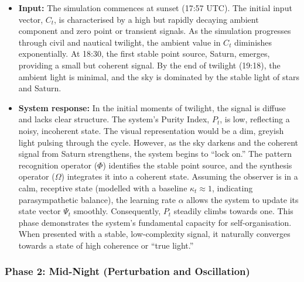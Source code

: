 \documentclass{article}
\begin{document}
\begin{itemize}
    \item \textbf{Input:} The simulation commences at sunset (17:57 UTC). The initial input vector, $C_t$, is characterised by a high but rapidly decaying ambient component and zero point or transient signals. As the simulation progresses through civil and nautical twilight, the ambient value in $C_t$ diminishes exponentially. At 18:30, the first stable point source, Saturn, emerges, providing a small but coherent signal. By the end of twilight (19:18), the ambient light is minimal, and the sky is dominated by the stable light of stars and Saturn.
    \item \textbf{System response:} In the initial moments of twilight, the signal is diffuse and lacks clear structure. The system's Purity Index, $P_t$, is low, reflecting a noisy, incoherent state. The visual representation would be a dim, greyish light pulsing through the cycle. However, as the sky darkens and the coherent signal from Saturn strengthens, the system begins to ``lock on.'' The pattern recognition operator ($\Phi$) identifies the stable point source, and the synthesis operator ($\Omega$) integrates it into a coherent state. Assuming the observer is in a calm, receptive state (modelled with a baseline $\kappa_t \approx 1$, indicating parasympathetic balance), the learning rate $\alpha$ allows the system to update its state vector $\Psi_t$ smoothly. Consequently, $P_t$ steadily climbs towards one. This phase demonstrates the system's fundamental capacity for self-organisation. When presented with a stable, low-complexity signal, it naturally converges towards a state of high coherence or ``true light.''
\end{itemize}

\subsubsection{Phase 2: Mid-Night (Perturbation and Oscillation)}
\end{document}
